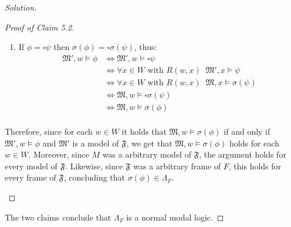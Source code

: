 \documentclass[12pt,a4paper]{report}
\theoremstyle{definition}
\newcommand{\model}[1]{\mathfrak{#1}}           %
\begin{document}
\begin{proof}[Solution]
\begin{proof}[Proof of Claim 5.2]
\begin{itemize}
\begin{enumerate}
                    \item If $\phi = \square \psi$ then $\sigma(\phi) = \square \sigma(\psi)$, thus:
                    \[\begin{split}
                        \model{M'}, w \models \phi & \iff \model{M'}, w \models \square \psi \\
                        &\iff \forall x \in W \text{ with } R(w,x) \;\; \model{M'}, x \models \psi \\
                        &\iff \forall x \in W \text{ with } R(w,x) \;\; \model{M}, x \models \sigma(\psi) \\
                        &\iff \model{M}, w \models \square \sigma(\psi) \\
                        &\iff \model{M}, w \models \sigma(\phi) \\
                    \end{split} \]
                \end{enumerate}

                Therefore, since for each $w \in W$ it holds that $\model{M}, w \models \sigma(\phi)$ if and only if $\model{M'}, w \models \phi$ and $\model{M'}$ is a model of $\model{F}$, we get that $\model{M}, w \models \sigma(\phi)$ holds for each $w \in W$. Moreover, since $M$ was a arbitrary model of $\model{F}$, the argument holds for every model of $\model{F}$. Likewise, since $\model{F}$ was a arbitrary frame of $F$, this holds for every frame of $\model{F}$, concluding that $\sigma(\phi) \in \Lambda_{F}$.
            \end{itemize}
        \end{proof}

        The two claims conclude that $\Lambda_{F}$ is a normal modal logic.
    \end{proof}
\end{document}
